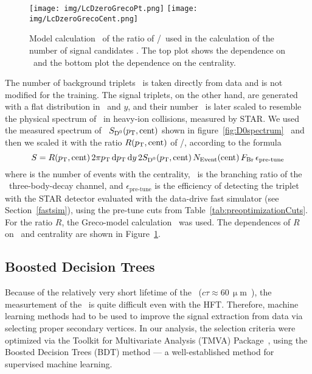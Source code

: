 \begin{figure}[!htb]
\centering
\texttt{[image: img/LcDzeroGrecoPt.png]}
\texttt{[image: img/LcDzeroGrecoCent.png]}

\caption[Model calculation of the ratio of \Lambdac/\dzero\ used in the calculation of the number of signal candidates.]{\label{fig:greco}Model calculation~\cite{PlumariGreco} of the ratio of \Lambdac/\dzero\ used in the calculation of the number of signal candidates \Nsig\@. The top plot shows the dependence on \pt\ and the bottom plot the dependence on the centrality.}

\end{figure}

The number of background triplets \Nbkg{}\ is taken directly from data and is not modified for the training. The signal triplets, on the other hand, are generated with a flat distribution in \pt\ and $y$, and their number \Nsig{}\ is later scaled to resemble the physical spectrum of \Lambdac\ in heavy-ion collisions, measured by STAR\@. We used the measured spectrum of \dzero\  $S_{{\text{D}^0}}({p_{\mathrm{T}}}, \mathrm{cent})$ shown in figure~\ref{fig:D0spectrum}~\cite{D0paper} and then we scaled it with the ratio $R({p_{\mathrm{T}}}, \mathrm{cent})$ of \dzero/\Lambdac, according to the formula
\begin{equation}
 S = R({p_{\mathrm{T}}}, \mathrm{cent}) \,2\pi {p_{\mathrm{T}}} \,\mathrm{d}{p_{\mathrm{T}}} \,\mathrm{d} y \,2S_{{\text{D}^0}}({p_{\mathrm{T}}}, \mathrm{cent})\, N_\mathrm{Event}(\mathrm{cent})\, F_\mathrm{Br}\, \epsilon_\text{pre-tune}
\end{equation}
where \Nevt{} is the number of events with the centrality, \branching\ is the branching ratio of the \pKpi\ three-body-decay channel, and $\epsilon_\text{pre-tune}$ is the efficiency of detecting the triplet with the STAR detector evaluated with the data-drive fast simulator (see Section~\ref{fastsim}), using the pre-tune cuts from Table~\ref{tab:preoptimizationCuts}\@.
For the ratio $R$, the Greco-model calculation~\cite{PlumariGreco} was used. The dependences of $R$ on \pt\ and centrality are shown in Figure~\ref{fig:greco}\@.

\subsection{Boosted Decision Trees}

Because of the relatively very short lifetime of the \Lambdac\ ($c\tau \approx 60\,\upmu$m~\cite{PDG}), the measurtement of the \Lambdac\ is quite difficult even with the HFT\@. Therefore, machine learning methods had to be used to improve the signal extraction from data via selecting proper secondary vertices.
In our analysis, the selection criteria were optimized via the Toolkit for Multivariate Analysis (TMVA) Package~\cite{TMVA}, using the Boosted Decision Trees (BDT) method --- a well-established method for supervised machine learning.


